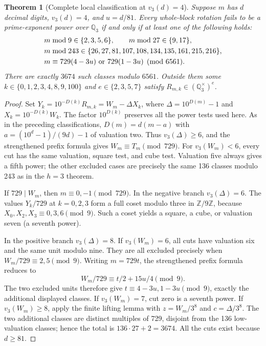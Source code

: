 \documentclass[10pt]{article}
\newtheorem{theorem}{Theorem}
\begin{document}
\begin{theorem}[Complete local classification at $v_3(d)=4$]\label{thm:h4-complete}
Suppose $m$ has $d$ decimal digits, $v_3(d)=4$, and $u=d/81$.
Every whole-block rotation fails to be a prime-exponent power over
$\mathbb Q_3$ if and only if at least one of the following holds:
\[
\begin{split}
&m\bmod9\in\{2,3,5,6\},\qquad m\bmod27\in\{9,17\},\\
&m\bmod243\in\{26,27,81,107,108,134,135,161,215,216\},\\
&m\equiv729(4-3u)\ \hbox{or}\ 729(1-3u)\pmod{6561}.
\end{split}
\]
There are exactly $3674$ such classes modulo $6561$.
Outside them some $k\in\{0,1,2,3,4,8,9,100\}$ and
$e\in\{2,3,5,7\}$ satisfy $R_{m,k}\in(\mathbb Q_3^\times)^e$.
\end{theorem}
\begin{proof}
Set $Y_k=10^{-D(k)}R_{m,k}=W_m-\Delta X_k$, where
$\Delta=10^{D(m)}-1$ and $X_k=10^{-D(k)}W_k$.
The factor $10^{D(k)}$ preserves all the power tests used here.
As in the preceding classifications,
$D(m)=d(m-a)$ with $a=(10^d-1)/(9d)-1$ of valuation two.
Thus $v_3(\Delta)\ge6$, and the strengthened prefix formula gives
$W_m\equiv T_m\pmod{729}$.
For $v_3(W_m)<6$, every cut has the same valuation, square test,
and cube test. Valuation five always gives a fifth power; the other
excluded cases are precisely the same 136 classes modulo 243 as
in the $h=3$ theorem.

If $729\mid W_m$, then $m\equiv0,-1\pmod{729}$.
In the negative branch $v_3(\Delta)=6$.
The values $Y_k/729$ at $k=0,2,3$ form a full coset modulo three
in $\mathbb Z/9\mathbb Z$, because
$X_0,X_2,X_3\equiv0,3,6\pmod9$.
Such a coset yields a square, a cube, or valuation seven (a seventh power).

In the positive branch $v_3(\Delta)=8$.
If $v_3(W_m)=6$, all cuts have valuation six and the same unit modulo
nine. They are all excluded precisely when $W_m/729\equiv2,5\pmod9$.
Writing $m=729t$, the strengthened prefix formula reduces to
\[
 W_m/729\equiv t/2+15u/4\pmod9.
\]
The two excluded units therefore give
$t\equiv4-3u,1-3u\pmod9$, exactly the additional displayed classes.
If $v_3(W_m)=7$, cut zero is a seventh power.
If $v_3(W_m)\ge8$, apply the finite lifting lemma with
$z=W_m/3^8$ and $c=\Delta/3^8$.
The two additional classes are distinct multiples of 729, disjoint
from the 136 low-valuation classes; hence the total is
$136\cdot27+2=3674$. All the cuts exist because $d\ge81$.
\end{proof}
\end{document}

